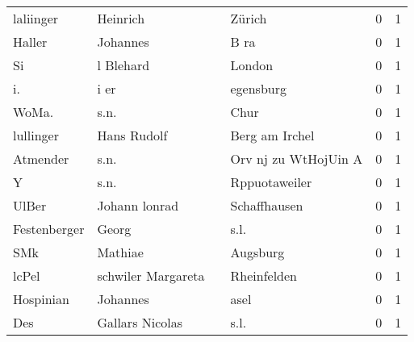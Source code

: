 \begin{center}
\begin{tiny}
\begin{longtabu}{llllrr}
                laliinger &                           Heinrich &             &                                      Zürich &          0 &         1 \\
                   Haller &                           Johannes &             &                                        B ra &          0 &         1 \\
                       Si &                          l Blehard &             &                                      London &          0 &         1 \\
                       i. &                               i er &             &                                   egensburg &          0 &         1 \\
                    WoMa. &                               s.n. &             &                                        Chur &          0 &         1 \\
                lullinger &                        Hans Rudolf &             &                              Berg am Irchel &          0 &         1 \\
                 Atmender &                               s.n. &             &                        Orv nj zu WtHojUin A &          0 &         1 \\
                        Y &                               s.n. &             &                               Rppuotaweiler &          0 &         1 \\
                    UlBer &                      Johann lonrad &             &                                Schaffhausen &          0 &         1 \\
             Festenberger &                              Georg &             &                                        s.l. &          0 &         1 \\
                      SMk &                            Mathiae &             &                                    Augsburg &          0 &         1 \\
                    lcPel &                 schwiler Margareta &             &                                 Rheinfelden &          0 &         1 \\
                Hospinian &                           Johannes &             &                                        asel &          0 &         1 \\
                      Des &                    Gallars Nicolas &             &                                        s.l. &          0 &         1 \\

\end{longtabu}
\end{tiny}
\end{center}
